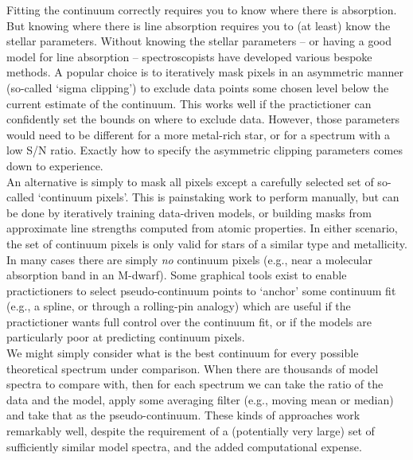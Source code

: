\documentclass[modern]{aastex631}
\begin{document}
Fitting the continuum correctly requires you to know where there is absorption. But knowing where there is line absorption requires you to (at least) know the stellar parameters. Without knowing the stellar parameters -- or having a good model for line absorption -- spectroscopists have developed various bespoke methods. A popular choice is to iteratively mask pixels in an asymmetric manner (so-called `sigma clipping') to exclude data points some chosen level below the current estimate of the continuum. This works well if the practictioner can confidently set the bounds on where to exclude data. However, those parameters would need to be different for a more metal-rich star, or for a spectrum with a low S/N ratio. Exactly how to specify the asymmetric clipping parameters comes down to experience.\\

An alternative is simply to mask all pixels except a carefully selected set of so-called `continuum pixels'. This is painstaking work to perform manually, but can be done by iteratively training data-driven models, or building masks from approximate line strengths computed from atomic properties. In either scenario, the set of continuum pixels is only valid for stars of a similar type and metallicity. In many cases there are simply \emph{no} continuum pixels (e.g., near a molecular absorption band in an M-dwarf). Some graphical tools exist to enable practictioners to select pseudo-continuum points to `anchor' some continuum fit (e.g., a spline, or through a rolling-pin analogy) which are useful if the practictioner wants full control over the continuum fit, or if the models are particularly poor at predicting continuum pixels.\\

We might simply consider what is the best continuum for every possible theoretical spectrum under comparison. When there are thousands of model spectra to compare with, then for each spectrum we can take the ratio of the data and the model, apply some averaging filter (e.g., moving mean or median) and take that as the pseudo-continuum. These kinds of approaches work remarkably well, despite the requirement of a (potentially very large) set of sufficiently similar model spectra, and the added computational expense.\\
\end{document}
